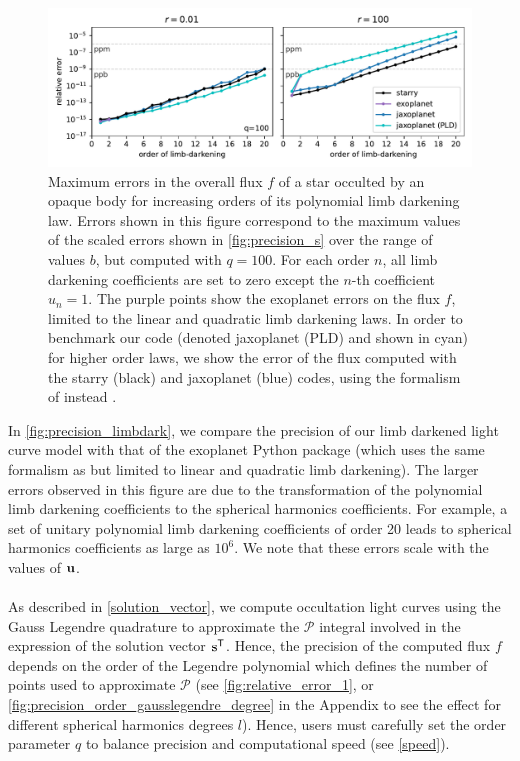 \documentclass[modern]{aastex631}
\begin{document}
\begin{figure}[H]
    \begin{center}
        \includegraphics[width=\textwidth]{../workflows/figures/limbdark_error.PDF}
        \caption{Maximum errors in the overall flux $f$ of a star occulted by an opaque body for increasing orders of its polynomial limb darkening law. Errors shown in this figure correspond to the maximum values of the scaled errors shown in \autoref{fig:precision_s} over the range of values $b$, but computed with $q=100$. For each order $n$, all limb darkening coefficients are set to zero except the $n$-th coefficient $u_n=1$. The purple points show the \textsf{exoplanet} errors on the flux $f$, limited to the linear and quadratic limb darkening laws. In order to benchmark our code (denoted \textsf{jaxoplanet (PLD)} and shown in cyan) for higher order laws, we show the error of the flux computed with the \textsf{starry} (black) and \textsf{jaxoplanet} (blue) codes, using the formalism of \cite{starry} instead \cite{Agol2020}. }
        \label{fig:precision_limbdark}
    \end{center}
\end{figure}
In \autoref{fig:precision_limbdark}, we compare the precision of our limb darkened light curve model with that of the \textsf{exoplanet} Python package (which uses the same formalism as \cite{Agol2020} but limited to linear and quadratic limb darkening). The larger errors observed in this figure are due to the transformation of the polynomial limb darkening coefficients to the spherical harmonics coefficients. For example, a set of unitary polynomial limb darkening coefficients of order 20 leads to spherical harmonics coefficients as large as $10^6$. We note that these errors scale with the values of ${\mathbf{u}}$.\\\\
As described in \autoref{solution_vector}, we compute occultation light curves using the Gauss Legendre quadrature to approximate the $\mathcal{P}$ integral involved in the expression of the solution vector ${\mathbf{s}}^\mathsf{T}$. Hence, the precision of the computed flux $f$ depends on the order of the Legendre polynomial which defines the number of points used to approximate $\mathcal{P}$ (see \autoref{fig:relative_error_1}, or  \autoref{fig:precision_order_gausslegendre_degree} in the Appendix to see the effect for different spherical harmonics degrees $l$). Hence, users must carefully set the order parameter $q$ to balance precision and computational speed (see \autoref{speed}).
\end{document}
